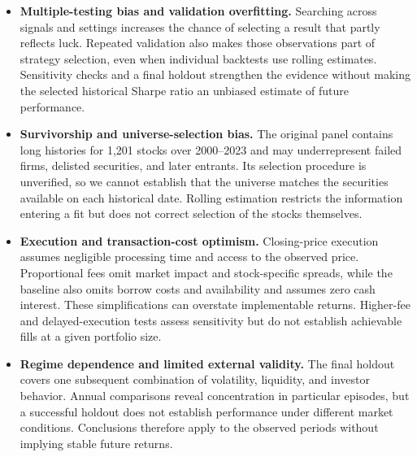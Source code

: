 \documentclass[11pt,letterpaper]{article}
\begin{document}
\begin{itemize}
    \item \textbf{Multiple-testing bias and validation overfitting.}
    Searching across signals and settings increases the chance of selecting
    a result that partly reflects luck. Repeated validation also makes
    those observations part of strategy selection, even when individual
    backtests use rolling estimates. Sensitivity checks and a final holdout
    strengthen the evidence without making the selected historical Sharpe
    ratio an unbiased estimate of future performance.

    \item \textbf{Survivorship and universe-selection bias.} The original
    panel contains long histories for 1,201 stocks over 2000--2023 and may
    underrepresent failed firms, delisted securities, and later entrants.
    Its selection procedure is unverified, so we cannot establish that
    the universe matches the securities available on each historical date.
    Rolling estimation restricts the information entering a fit but does
    not correct selection of the stocks themselves.

    \item \textbf{Execution and transaction-cost optimism.} Closing-price
    execution assumes negligible processing time and access to the observed
    price. Proportional fees omit market impact and stock-specific spreads,
    while the baseline also omits borrow costs and availability and assumes
    zero cash interest. These simplifications can overstate implementable
    returns. Higher-fee and delayed-execution tests assess sensitivity but
    do not establish achievable fills at a given portfolio size.

    \item \textbf{Regime dependence and limited external validity.} The
    final holdout covers one subsequent combination of volatility, liquidity,
    and investor behavior. Annual comparisons reveal concentration in
    particular episodes, but a successful holdout does not establish
    performance under different market conditions. Conclusions therefore
    apply to the observed periods without implying stable future returns.
\end{itemize}

\end{document}
